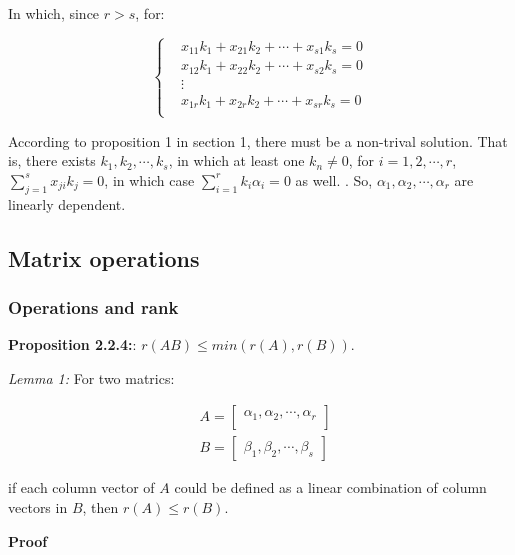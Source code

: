\documentclass{article}
\begin{document}
In which, since \(r>s\), for:

\begin{equation}
\left
\{
\begin{split}
&x_{11}k_1 + x_{21}k_2 + \cdots + x_{s1}k_s = 0 \\
&x_{12}k_1 + x_{22}k_2 + \cdots + x_{s2}k_s = 0 \\
&\vdots\\
&x_{1r}k_1 + x_{2r}k_2 + \cdots + x_{sr}k_s = 0 \\
\end{split}
\right.
\end{equation}

According to proposition 1 in section 1, there
must be a non-trival solution. That is, there exists \(k_1, k_2, \cdots, k_s\),
in which at least one \(k_n \neq 0\), for \(i = 1, 2, \cdots, r\), \(\sum_{j=1}^s
x_{ji}k_j=0\), in which case \(\sum_{i=1}^rk_i\alpha_i=0\) as well.
. So, \(\alpha_1, \alpha_2,
\cdots, \alpha_r\) are linearly dependent.

\subsection{Matrix operations}

\subsubsection{Operations and rank}

\textbf{Proposition 2.2.4:}: \(r(AB)\leq min(r(A), r(B))\).

\vspace{2mm}
\textit{Lemma 1:}
For two matrics:

\begin{equation}
\begin{split}
    &A=\begin{bmatrix}
    \alpha_1, \alpha_2, \cdots, \alpha_r \\
    \end{bmatrix}\\
    &B=\begin{bmatrix}
    \beta_1, \beta_2, \cdots, \beta_s
    \end{bmatrix}
\end{split}
\end{equation}

if each column vector of \(A\) could be defined as a linear combination
of column vectors in \(B\), then \(r(A)\leq r(B)\).

\vspace{2mm}
\textbf{Proof}
\end{document}
